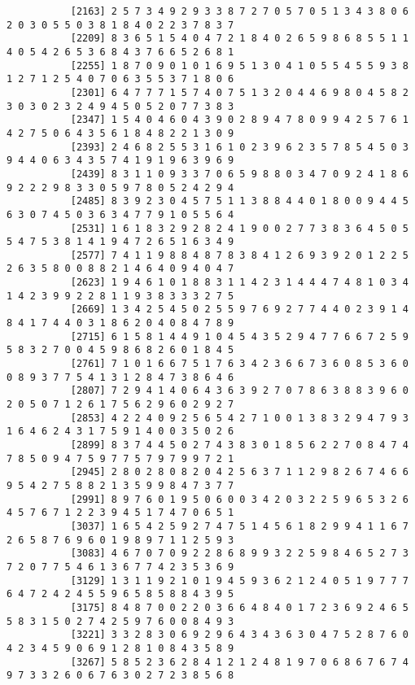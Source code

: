 \documentclass{article}
\begin{document}
\begin{itemize}
\begin{scriptsize}
\begin{verbatim}
		   [2163] 2 5 7 3 4 9 2 9 3 3 8 7 2 7 0 5 7 0 5 1 3 4 3 8 0 6 2 0 3 0 5 5 0 3 8 1 8 4 0 2 2 3 7 8 3 7
		   [2209] 8 3 6 5 1 5 4 0 4 7 2 1 8 4 0 2 6 5 9 8 6 8 5 5 1 1 4 0 5 4 2 6 5 3 6 8 4 3 7 6 6 5 2 6 8 1
		   [2255] 1 8 7 0 9 0 1 0 1 6 9 5 1 3 0 4 1 0 5 5 4 5 5 9 3 8 1 2 7 1 2 5 4 0 7 0 6 3 5 5 3 7 1 8 0 6
		   [2301] 6 4 7 7 7 1 5 7 4 0 7 5 1 3 2 0 4 4 6 9 8 0 4 5 8 2 3 0 3 0 2 3 2 4 9 4 5 0 5 2 0 7 7 3 8 3
		   [2347] 1 5 4 0 4 6 0 4 3 9 0 2 8 9 4 7 8 0 9 9 4 2 5 7 6 1 4 2 7 5 0 6 4 3 5 6 1 8 4 8 2 2 1 3 0 9
		   [2393] 2 4 6 8 2 5 5 3 1 6 1 0 2 3 9 6 2 3 5 7 8 5 4 5 0 3 9 4 4 0 6 3 4 3 5 7 4 1 9 1 9 6 3 9 6 9
		   [2439] 8 3 1 1 0 9 3 3 7 0 6 5 9 8 8 0 3 4 7 0 9 2 4 1 8 6 9 2 2 2 9 8 3 3 0 5 9 7 8 0 5 2 4 2 9 4
		   [2485] 8 3 9 2 3 0 4 5 7 5 1 1 3 8 8 4 4 0 1 8 0 0 9 4 4 5 6 3 0 7 4 5 0 3 6 3 4 7 7 9 1 0 5 5 6 4
		   [2531] 1 6 1 8 3 2 9 2 8 2 4 1 9 0 0 2 7 7 3 8 3 6 4 5 0 5 5 4 7 5 3 8 1 4 1 9 4 7 2 6 5 1 6 3 4 9
		   [2577] 7 4 1 1 9 8 8 4 8 7 8 3 8 4 1 2 6 9 3 9 2 0 1 2 2 5 2 6 3 5 8 0 0 8 8 2 1 4 6 4 0 9 4 0 4 7
		   [2623] 1 9 4 6 1 0 1 8 8 3 1 1 4 2 3 1 4 4 4 7 4 8 1 0 3 4 1 4 2 3 9 9 2 2 8 1 1 9 3 8 3 3 3 2 7 5
		   [2669] 1 3 4 2 5 4 5 0 2 5 5 9 7 6 9 2 7 7 4 4 0 2 3 9 1 4 8 4 1 7 4 4 0 3 1 8 6 2 0 4 0 8 4 7 8 9
		   [2715] 6 1 5 8 1 4 4 9 1 0 4 5 4 3 5 2 9 4 7 7 6 6 7 2 5 9 5 8 3 2 7 0 0 4 5 9 8 6 8 2 6 0 1 8 4 5
		   [2761] 7 1 0 1 6 6 7 5 1 7 6 3 4 2 3 6 6 7 3 6 0 8 5 3 6 0 0 8 9 3 7 7 5 4 1 3 1 2 8 4 7 3 8 6 4 6
		   [2807] 7 2 9 4 1 4 0 6 4 3 6 3 9 2 7 0 7 8 6 3 8 8 3 9 6 0 2 0 5 0 7 1 2 6 1 7 5 6 2 9 6 0 2 9 2 7
		   [2853] 4 2 2 4 0 9 2 5 6 5 4 2 7 1 0 0 1 3 8 3 2 9 4 7 9 3 1 6 4 6 2 4 3 1 7 5 9 1 4 0 0 3 5 0 2 6
		   [2899] 8 3 7 4 4 5 0 2 7 4 3 8 3 0 1 8 5 6 2 2 7 0 8 4 7 4 7 8 5 0 9 4 7 5 9 7 7 5 7 9 7 9 9 7 2 1
		   [2945] 2 8 0 2 8 0 8 2 0 4 2 5 6 3 7 1 1 2 9 8 2 6 7 4 6 6 9 5 4 2 7 5 8 8 2 1 3 5 9 9 8 4 7 3 7 7
		   [2991] 8 9 7 6 0 1 9 5 0 6 0 0 3 4 2 0 3 2 2 5 9 6 5 3 2 6 4 5 7 6 7 1 2 2 3 9 4 5 1 7 4 7 0 6 5 1
		   [3037] 1 6 5 4 2 5 9 2 7 4 7 5 1 4 5 6 1 8 2 9 9 4 1 1 6 7 2 6 5 8 7 6 9 6 0 1 9 8 9 7 1 1 2 5 9 3
		   [3083] 4 6 7 0 7 0 9 2 2 8 6 8 9 9 3 2 2 5 9 8 4 6 5 2 7 3 7 2 0 7 7 5 4 6 1 3 6 7 7 4 2 3 5 3 6 9
		   [3129] 1 3 1 1 9 2 1 0 1 9 4 5 9 3 6 2 1 2 4 0 5 1 9 7 7 7 6 4 7 2 4 2 4 5 5 9 6 5 8 5 8 8 4 3 9 5
		   [3175] 8 4 8 7 0 0 2 2 0 3 6 6 4 8 4 0 1 7 2 3 6 9 2 4 6 5 5 8 3 1 5 0 2 7 4 2 5 9 7 6 0 0 8 4 9 3
		   [3221] 3 3 2 8 3 0 6 9 2 9 6 4 3 4 3 6 3 0 4 7 5 2 8 7 6 0 4 2 3 4 5 9 0 6 9 1 2 8 1 0 8 4 3 5 8 9
		   [3267] 5 8 5 2 3 6 2 8 4 1 2 1 2 4 8 1 9 7 0 6 8 6 7 6 7 4 9 7 3 3 2 6 0 6 7 6 3 0 2 7 2 3 8 5 6 8

\end{verbatim}
\end{scriptsize}
\end{itemize}
\end{document}
